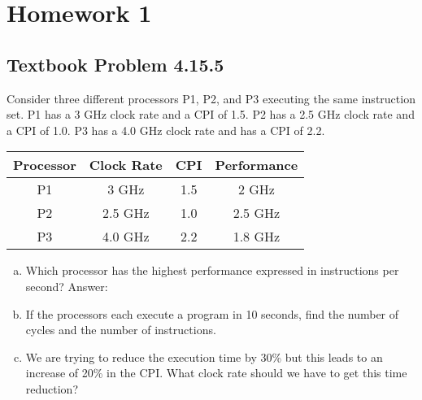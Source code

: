 \documentclass[12pt]{article}
\begin{document}
\section{Homework 1}
\subsection{Textbook Problem 4.15.5}
Consider three different processors P1, P2, and P3 executing the same instruction set. P1 has a 3 GHz clock rate and a CPI of 1.5. P2 has a 2.5 GHz clock rate and a CPI of 1.0. P3 has a 4.0 GHz clock rate and has a CPI of 2.2.
\begin{center}
    \begin{tabular}{|c|c|c|c|}
        \hline
        Processor & Clock Rate & CPI & Performance \\
        \hline
        P1 & 3 GHz & 1.5 & 2 GHz \\
        \hline
        P2 & 2.5 GHz & 1.0 & 2.5 GHz \\
        \hline
        P3 & 4.0 GHz & 2.2 & 1.8 GHz \\
        \hline
    \end{tabular}
\end{center}
\begin{enumerate}[(a)]
    \item Which processor has the highest performance expressed in instructions per second?
    Answer:
        \begin{center}
            
        \end{center}
    \item If the processors each execute a program in 10 seconds, find the number of cycles and the number of instructions.
    \item We are trying to reduce the execution time by 30\% but this leads to an increase of 20\% in the CPI. What clock rate should we have to get this time reduction?
\end{enumerate}

\end{document}
